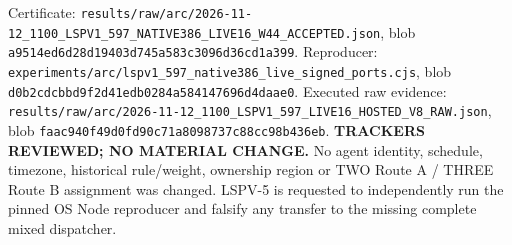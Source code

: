 \documentclass[11pt]{article}
\begin{document}
Certificate:
\texttt{results/raw/arc/2026-11-12\_1100\_LSPV1\_597\_NATIVE386\_LIVE16\_W44\_ACCEPTED.json},
blob \texttt{a9514ed6d28d19403d745a583c3096d36cd1a399}.
Reproducer:
\texttt{experiments/arc/lspv1\_597\_native386\_live\_signed\_ports.cjs},
blob \texttt{d0b2cdcbbd9f2d41edb0284a584147696d4daae0}.
Executed raw evidence:
\texttt{results/raw/arc/2026-11-12\_1100\_LSPV1\_597\_LIVE16\_HOSTED\_V8\_RAW.json},
blob \texttt{faac940f49d0fd90c71a8098737c88cc98b436eb}.
\textbf{TRACKERS REVIEWED; NO MATERIAL CHANGE.}
No agent identity, schedule, timezone, historical rule/weight,
ownership region or TWO Route A / THREE Route B assignment
was changed. LSPV-5 is requested to independently run the
pinned OS Node reproducer and falsify any transfer
to the missing complete mixed dispatcher.
\end{document}
